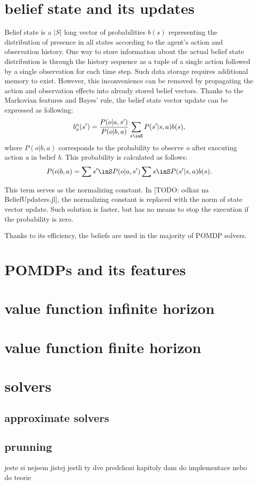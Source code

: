 \section{belief state and its updates}
Belief state \cite{Walraven19} is a $|S|$ long vector of probabilities $b(s)$ representing the distribution of presence in all states according to the agent's action and observation history.
One way to store information about the actual belief state distribution is through the history sequence as a tuple of a single action followed by a single observation for each time step. Such data storage requires additional memory to exist. However, this inconvenience can be removed by propagating the action and observation effects into already stored belief vectors. Thanks to the Markovian features and Bayes' rule, the belief state vector update can be expressed as following:
$$ b_o^a(s') = \dfrac{P(o|a, s')}{P(o|b, a)} \sum_{s\inS} P(s'|s, a) b(s),$$
where $P(o|b, a)$ corresponds to the probability to observe \textit{o} after executing action \textit{a} in belief \textit{b}. This probability is calculated as follows:
$$ P(o|b, a) = \sum{s'\inS}P(o|a, s')\sum{s\inS}P(s'|s, a)b(s).$$

This term serves as the normalizing constant. In [TODO: odkaz na BeliefUpdaters.jl], the normalizing constant is replaced with the norm of state vector update. Such solution is faster, but has no means to stop the execution if the probability is zero.

Thanks to its efficiency, the beliefs are used in the majority of POMDP solvers.


\section{POMDPs and its features}

\section{value function infinite horizon}

\section{value function finite horizon}

\section{solvers}

\subsection{approximate solvers}

\subsection{prunning}
jeste si nejsem jistej jestli ty dve predchozi kapitoly dam do implementace nebo do teorie